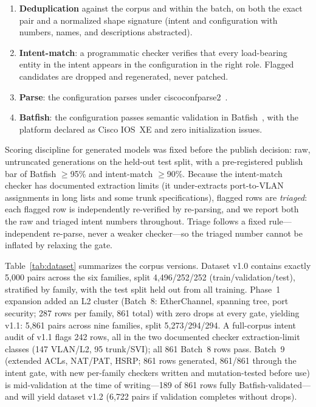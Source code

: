 \documentclass[conference]{IEEEtran}
\begin{document}
\begin{enumerate}
\item \textbf{Deduplication} against the corpus and within the batch, on both the exact pair and a normalized shape signature (intent and configuration with numbers, names, and descriptions abstracted).
\item \textbf{Intent-match}: a programmatic checker verifies that every load-bearing entity in the intent appears in the configuration in the right role. Flagged candidates are dropped and regenerated, never patched.
\item \textbf{Parse}: the configuration parses under ciscoconfparse2~\cite{ciscoconfparse2}.
\item \textbf{Batfish}: the configuration passes semantic validation in Batfish~\cite{fogel2015batfish}, with the platform declared as Cisco IOS~XE and zero initialization issues.
\end{enumerate}

Scoring discipline for generated models was fixed before the publish decision: raw, untruncated generations on the held-out test split, with a pre-registered publish bar of Batfish $\geq$95\% and intent-match $\geq$90\%. Because the intent-match checker has documented extraction limits (it under-extracts port-to-VLAN assignments in long lists and some trunk specifications), flagged rows are \emph{triaged}: each flagged row is independently re-verified by re-parsing, and we report both the raw and triaged intent numbers throughout. Triage follows a fixed rule---independent re-parse, never a weaker checker---so the triaged number cannot be inflated by relaxing the gate.

Table~\ref{tab:dataset} summarizes the corpus versions. Dataset v1.0 contains exactly 5,000 pairs across the six families, split 4,496/252/252 (train/validation/test), stratified by family, with the test split held out from all training. Phase~1 expansion added an L2 cluster (Batch~8: EtherChannel, spanning tree, port security; 287 rows per family, 861 total) with zero drops at every gate, yielding v1.1: 5,861 pairs across nine families, split 5,273/294/294. A full-corpus intent audit of v1.1 flags 242 rows, all in the two documented checker extraction-limit classes (147 VLAN/L2, 95 trunk/SVI); all 861 Batch~8 rows pass. Batch~9 (extended ACLs, NAT/PAT, HSRP; 861 rows generated, 861/861 through the intent gate, with new per-family checkers written and mutation-tested before use) is mid-validation at the time of writing---189 of 861 rows fully Batfish-validated---and will yield dataset v1.2 (6,722 pairs if validation completes without drops).
\end{document}
